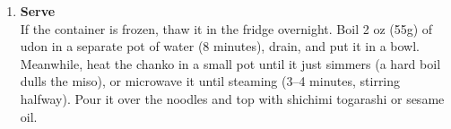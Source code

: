 \begin{enumerate}
      \item \textbf{Serve} \\
            If the container is frozen, thaw it in the fridge overnight. Boil 2 oz (55g) of udon
            in a separate pot of water (8 minutes), drain, and put it in a bowl. Meanwhile, heat
            the chanko in a small pot until it just simmers (a hard boil dulls the miso), or
            microwave it until steaming (3--4 minutes, stirring halfway). Pour it over the
            noodles and top with shichimi togarashi or sesame oil.

\end{enumerate}


